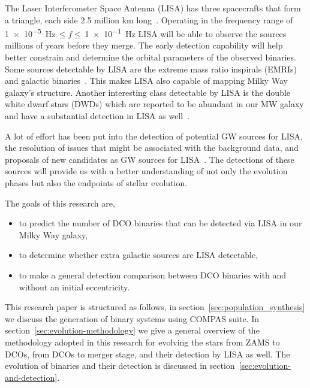 \documentclass[journal, twocolumn]{IEEEtran}
\begin{document}
    The Laser Interferometer Space Antenna (LISA) has three spacecrafts that form a triangle, each side 2.5 million
    km long~\cite{Prince2002, Robson2019}.
    Operating in the frequency range of \SI{1e-5}{\hertz}$\,\leq  f \leq\,$\SI{1e-1}{\hertz} LISA will be able to observe the sources millions of years before they merge.
    The early detection capability will help better constrain and determine the orbital parameters of the observed binaries.
    Some sources detectable by LISA are the extreme mass ratio inspirals (EMRIs)~\cite{Gair2017, Klein2016, Chapman2022} and galactic binaries~\cite{wagg2021gravitational, Abott2017, Digman2022}.
    This makes LISA also capable of mapping Milky Way galaxy's structure.
    Another interesting class detectable by LISA is the double white dwarf stars (DWDs) which are reported to be abundant in our MW galaxy and have a substantial detection in LISA as well~\cite{Korol2017, Nelemans2001, Willems2007, Ruiter2010}.

    A lot of effort has been put into the detection of potential GW sources for LISA, the resolution of issues that might be associated with the background data, and proposals of new candidates as GW sources for LISA~\cite[see, for example,][]{Lau2020, Sesana2009, Khakhaleva2020, Renzo2021, Fumagalli2022, wagg2021gravitational, Broekgaarden2021, Shao2021, Andrews2020, Belczynski2010, Guo2017, Babak2010, Blaut2010, Babak2008, Ruiter2010, Nelemans2001, Yu2010}.
    The detections of these sources will provide us with a better understanding of not only the evolution phases but also the endpoints of stellar evolution.

    The goals of this research are,
    \begin{itemize}%
        \item to predict the number of DCO binaries that can be detected via LISA in our Milky Way galaxy,
        \item to determine whether extra galactic sources are LISA detectable,
        \item to make a general detection comparison between DCO binaries with and without an initial eccentricity.
    \end{itemize}%

    This research paper is structured as follows, in section~\ref{sec:population_synthesis} we discuss the generation of binary systems using COMPAS suite.
    In section~\ref{sec:evolution-methodology} we give a general overview of the methodology adopted in this research for evolving the stars from ZAMS to DCOs, from DCOs to merger stage, and their detection by LISA as well.
    The evolution of binaries and their detection is discussed in section~\ref{sec:evolution-and-detection}.
\end{document}
